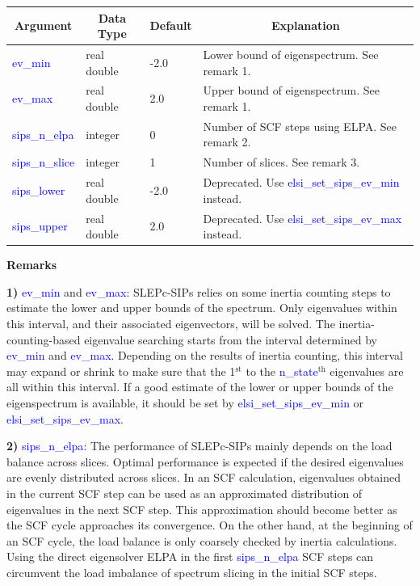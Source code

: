 \documentclass{report}
\begin{document}
\begin{tabular}[]{|p{30mm}|p{20mm}|p{15mm}|p{100mm}|}
\hline
\multicolumn{1}{|c|}{\textbf{Argument}} & \multicolumn{1}{c|}{\textbf{Data Type}} & \multicolumn{1}{c|}{\textbf{Default}} & \multicolumn{1}{c|}{\textbf{Explanation}}\\
\hline
\textcolor{blue}{ev\_min}        & real double & -2.0 & Lower bound of eigenspectrum.  See remark 1.\\
\hline
\textcolor{blue}{ev\_max}        & real double & 2.0  & Upper bound of eigenspectrum.  See remark 1.\\
\hline
\textcolor{blue}{sips\_n\_elpa}  & integer     & 0    & Number of SCF steps using ELPA.  See remark 2.\\
\hline
\textcolor{blue}{sips\_n\_slice} & integer     & 1    & Number of slices.  See remark 3.\\
\hline
\textcolor{blue}{sips\_lower}    & real double & -2.0 & Deprecated.  Use \textcolor{blue}{elsi\_set\_sips\_ev\_min} instead.\\
\hline
\textcolor{blue}{sips\_upper}    & real double & 2.0  & Deprecated.  Use \textcolor{blue}{elsi\_set\_sips\_ev\_max} instead.\\
\hline
\end{tabular}

\textbf{Remarks}

\textbf{1)} \textcolor{blue}{ev\_min} and \textcolor{blue}{ev\_max}:  SLEPc-SIPs relies on some inertia counting steps to estimate the lower and upper bounds of the spectrum.  Only eigenvalues within this interval, and their associated eigenvectors, will be solved.  The inertia-counting-based eigenvalue searching starts from the interval determined by \textcolor{blue}{ev\_min} and \textcolor{blue}{ev\_max}.  Depending on the results of inertia counting, this interval may expand or shrink to make sure that the 1$^\text{st}$ to the \textcolor{blue}{n\_state}$^\text{th}$ eigenvalues are all within this interval.  If a good estimate of the lower or upper bounds of the eigenspectrum is available, it should be set by \textcolor{blue}{elsi\_set\_sips\_ev\_min} or \textcolor{blue}{elsi\_set\_sips\_ev\_max}.

\textbf{2)} \textcolor{blue}{sips\_n\_elpa}:  The performance of SLEPc-SIPs mainly depends on the load balance across slices.  Optimal performance is expected if the desired eigenvalues are evenly distributed across slices.  In an SCF calculation, eigenvalues obtained in the current SCF step can be used as an approximated distribution of eigenvalues in the next SCF step.  This approximation should become better as the SCF cycle approaches its convergence.  On the other hand, at the beginning of an SCF cycle, the load balance is only coarsely checked by inertia calculations.  Using the direct eigensolver ELPA in the first \textcolor{blue}{sips\_n\_elpa} SCF steps can circumvent the load imbalance of spectrum slicing in the initial SCF steps.
\end{document}

